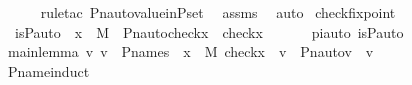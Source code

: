 \begin{isabellebody}
\ \ \ \ \isamarkupfalse%
\ {\isacharparenleft}{\kern0pt}rule{\isacharunderscore}{\kern0pt}tac\ Pn{\isacharunderscore}{\kern0pt}auto{\isacharunderscore}{\kern0pt}value{\isacharunderscore}{\kern0pt}in{\isacharunderscore}{\kern0pt}P{\isacharunderscore}{\kern0pt}set{\isacharparenright}{\kern0pt}\ \isamarkupfalse%
\ assms\ \isamarkupfalse%
\ auto\isanewline
{}\isamarkupfalse%
%
\endisatagproof
{\isafoldproof}%
%
\isadelimproof
\isanewline
%
\endisadelimproof
\isanewline
{}\isamarkupfalse%
\ check{\isacharunderscore}{\kern0pt}fixpoint\ {\isacharcolon}{\kern0pt}\ \isanewline
\ \ {\isachardoublequoteopen}is{\isacharunderscore}{\kern0pt}P{\isacharunderscore}{\kern0pt}auto{\isacharparenleft}{\kern0pt}{\isasympi}{\isacharparenright}{\kern0pt}\ {\isasymLongrightarrow}\ x\ {\isasymin}\ M\ {\isasymLongrightarrow}\ Pn{\isacharunderscore}{\kern0pt}auto{\isacharparenleft}{\kern0pt}{\isasympi}{\isacharparenright}{\kern0pt}{\isacharbackquote}{\kern0pt}{\isacharparenleft}{\kern0pt}check{\isacharparenleft}{\kern0pt}x{\isacharparenright}{\kern0pt}{\isacharparenright}{\kern0pt}\ {\isacharequal}{\kern0pt}\ check{\isacharparenleft}{\kern0pt}x{\isacharparenright}{\kern0pt}{\isachardoublequoteclose}\isanewline
%
\isadelimproof
%
\endisadelimproof
%
\isatagproof
{}\isamarkupfalse%
\ {\isacharminus}{\kern0pt}\ \isanewline
\ \ \isamarkupfalse%
\ piauto{\isacharcolon}{\kern0pt}\ {\isachardoublequoteopen}is{\isacharunderscore}{\kern0pt}P{\isacharunderscore}{\kern0pt}auto{\isacharparenleft}{\kern0pt}{\isasympi}{\isacharparenright}{\kern0pt}{\isachardoublequoteclose}\ \isanewline
\ \ \isamarkupfalse%
\ mainlemma{\isacharcolon}{\kern0pt}\ {\isachardoublequoteopen}{\isasymAnd}v{\isachardot}{\kern0pt}\ v\ {\isasymin}\ P{\isacharunderscore}{\kern0pt}names\ {\isasymLongrightarrow}\ {\isasymforall}x\ {\isasymin}\ M{\isachardot}{\kern0pt}\ {\isacharparenleft}{\kern0pt}check{\isacharparenleft}{\kern0pt}x{\isacharparenright}{\kern0pt}\ {\isacharequal}{\kern0pt}\ v\ {\isasymlongrightarrow}\ Pn{\isacharunderscore}{\kern0pt}auto{\isacharparenleft}{\kern0pt}{\isasympi}{\isacharparenright}{\kern0pt}{\isacharbackquote}{\kern0pt}{\isacharparenleft}{\kern0pt}v{\isacharparenright}{\kern0pt}\ {\isacharequal}{\kern0pt}\ v{\isacharparenright}{\kern0pt}{\isachardoublequoteclose}\ \isanewline
\ \ \ \ \isamarkupfalse%
\ P{\isacharunderscore}{\kern0pt}name{\isacharunderscore}{\kern0pt}induct\isanewline
\ \ \ \ \isamarkupfalse%

\end{isabellebody}
